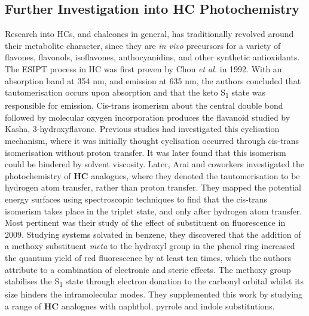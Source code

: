 \subsection{Further Investigation into \textbf{HC} Photochemistry}\label{section: lom HC spectroscopy}
Research into \acp{HC}, and chalcones in general, has traditionally revolved around their metabolite character, since they are \textit{in vivo} precursors for a variety of flavones, flavonols, isoflavones, anthocyanidins, and other synthetic antioxidants.\cite{Singh2014} The \ac{ESIPT} process in \ac{HC} was first proven by Chou \textit{et al.} in 1992.\cite{Chou1992} With an absorption band at 354 nm, and emission at 635 nm, the authors concluded that tautomerisation occurs upon absorption and that the keto S\textsubscript{1} state was responsible for emission. Cis-trans isomerism about the central double bond followed by molecular oxygen incorporation produces the flavanoid studied by Kasha, 3-hydroxyflavone. Previous studies had investigated this cyclisation mechanism, where it was initially thought cyclisation occurred through cis-trans isomerisation without proton transfer.\cite{Stermitz1975,Matsushima1985} It was later found that this isomerism could be hindered by solvent viscosity.\cite{Tokumura1998} Later, Arai and coworkers investigated the photochemistry of \textbf{HC} analogues, where they denoted the tautomerisation to be hydrogen atom transfer, rather than proton transfer.\cite{Arai1997,Norikane2002,Norikane2003,Kaneda2003,Kaneda2003a,Kaneda2004,Teshima2009} They mapped the potential energy surfaces using spectroscopic techniques to find that the cis-trans isomerism takes place in the triplet state, and only after hydrogen atom transfer. Most pertinent was their study of the effect of substituent on fluorescence in 2009.\cite{Teshima2009} Studying systems solvated in benzene, they discovered that the addition of a methoxy substituent \textit{meta} to the hydroxyl group in the phenol ring increased the quantum yield of red fluorescence by at least ten times, which the authors attribute to a combination of electronic and steric effects. The methoxy group stabilises the S\textsubscript{1} state through electron donation to the carbonyl \pipistar orbital whilst its size hinders the intramolecular modes. They supplemented this work by studying a range of \textbf{HC} analogues with naphthol, pyrrole and indole substitutions.\cite{Shinozaki2018}

